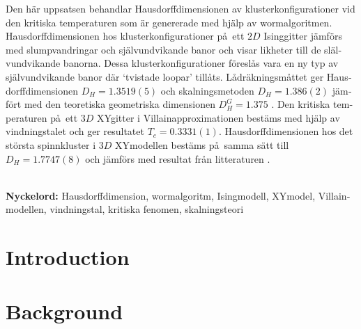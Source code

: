\documentclass[nocoverpage,swedish,g5paper]{thesis}
\begin{document}
\begin{otherlanguage}{swedish}
\begin{foreginabstract}
Den h\"ar uppsatsen behandlar Hausdorffdimensionen av klusterkonfigurationer vid den kritiska temperaturen som \"ar genererade med hj\"alp av wormalgoritmen. Hausdorffdimensionen hos klusterkonfigurationer p\aa \ ett $2D$ Isinggitter j\"amf\"ors med slumpvandringar och sj\"alvundvikande banor och visar likheter till de sl\"alvundvikande banorna. Dessa klusterkonfigurationer f\"oresl\aa s vara en ny typ av sj\"alvundvikande banor d\"ar `tvistade loopar' till\aa ts. L\aa dr\"akningsm\aa ttet \cite{strogatz:dynamics_chaos} ger Hausdorffdimensionen $D_H = 1.3519(5)$ och skalningsmetoden \cite{Hove:hausdorff_crit_fluctuations} $D_H = 1.386(2)$ j\"amf\"ort med den teoretiska geometriska dimensionen $D_H^{G} = 1.375$ \cite{Duplantier:GeoHausdorff}. Den kritiska temperaturen p\aa \  ett $3D$ XYgitter i Villainapproximationen best\"ams med hj\"alp av vindningstalet och ger resultatet $T_c = 0.3331(1)$. Hausdorffdimensionen hos det st\"orsta spinnkluster i $3D$ XYmodellen best\"ams p\aa\  samma s\"att till $D_H = 1.7747(8)$ och j\"amf\"ors med resultat fr\aa n litteraturen \cite{Prokofev:comment_on_hove_hausdorff_crit_fluct} \cite{Hove:hausdorff_crit_fluctuations}.
\\ \noindent \strut \\
\textbf{Nyckelord:} Hausdorffdimension, wormalgoritm, Isingmodell, XYmodel, Villainmodellen, vindningstal, kritiska fenomen, skalningsteori
\end{foreginabstract}
\end{otherlanguage}

\begin{preface}

\end{preface}

\tableofcontents

\mainmatter


\chapter{Introduction}


\chapter{Background}\label{ch:Background}

\end{document}
